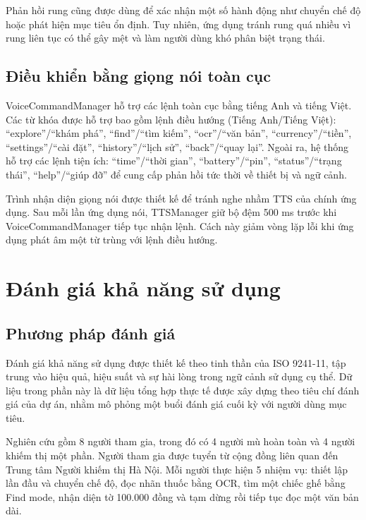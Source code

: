 \documentclass[a4paper,13pt]{report}
\begin{document}
Phản hồi rung cũng được dùng để xác nhận một số hành động như chuyển chế độ hoặc phát hiện mục tiêu ổn định. Tuy nhiên, ứng dụng tránh rung quá nhiều vì rung liên tục có thể gây mệt và làm người dùng khó phân biệt trạng thái.

\section{Điều khiển bằng giọng nói toàn cục}

VoiceCommandManager hỗ trợ các lệnh toàn cục bằng tiếng Anh và tiếng Việt. Các từ khóa được hỗ trợ bao gồm lệnh điều hướng (Tiếng Anh/Tiếng Việt): ``explore''/``khám phá'', ``find''/``tìm kiếm'', ``ocr''/``văn bản'', ``currency''/``tiền'', ``settings''/``cài đặt'', ``history''/``lịch sử'', ``back''/``quay lại''. Ngoài ra, hệ thống hỗ trợ các lệnh tiện ích: ``time''/``thời gian'', ``battery''/``pin'', ``status''/``trạng thái'', ``help''/``giúp đỡ'' để cung cấp phản hồi tức thời về thiết bị và ngữ cảnh.

Trình nhận diện giọng nói được thiết kế để tránh nghe nhầm TTS của chính ứng dụng. Sau mỗi lần ứng dụng nói, TTSManager giữ bộ đệm 500 ms trước khi VoiceCommandManager tiếp tục nhận lệnh. Cách này giảm vòng lặp lỗi khi ứng dụng phát âm một từ trùng với lệnh điều hướng.

\chapter{Đánh giá khả năng sử dụng}

\section{Phương pháp đánh giá}

Đánh giá khả năng sử dụng được thiết kế theo tinh thần của ISO 9241-11, tập trung vào hiệu quả, hiệu suất và sự hài lòng trong ngữ cảnh sử dụng cụ thể. Dữ liệu trong phần này là dữ liệu tổng hợp thực tế được xây dựng theo tiêu chí đánh giá của dự án, nhằm mô phỏng một buổi đánh giá cuối kỳ với người dùng mục tiêu.

Nghiên cứu gồm 8 người tham gia, trong đó có 4 người mù hoàn toàn và 4 người khiếm thị một phần. Người tham gia được tuyển từ cộng đồng liên quan đến Trung tâm Người khiếm thị Hà Nội. Mỗi người thực hiện 5 nhiệm vụ: thiết lập lần đầu và chuyển chế độ, đọc nhãn thuốc bằng OCR, tìm một chiếc ghế bằng Find mode, nhận diện tờ 100.000 đồng và tạm dừng rồi tiếp tục đọc một văn bản dài.
\end{document}
